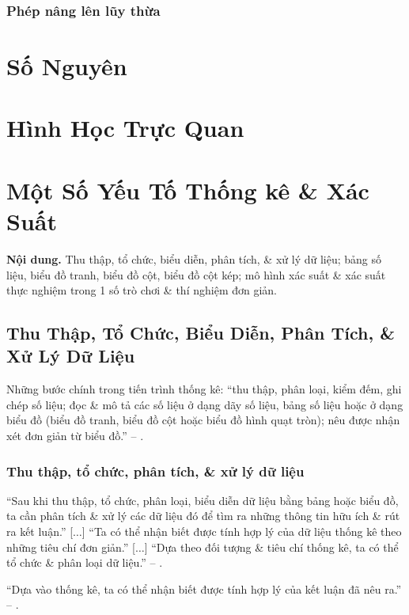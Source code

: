 \documentclass{article}
\numberwithin{equation}{section}
\begin{document}
\subsubsection{Phép nâng lên lũy thừa}

\section{Số Nguyên}

\section{Hình Học Trực Quan}

\section{Một Số Yếu Tố Thống kê \& Xác Suất}
\textbf{Nội dung.} Thu thập, tổ chức, biểu diễn, phân tích, \& xử lý dữ liệu; bảng số liệu, biểu đồ tranh, biểu đồ cột, biểu đồ cột kép; mô hình xác suất \& xác suất thực nghiệm trong 1 số trò chơi \& thí nghiệm đơn giản.

\subsection{Thu Thập, Tổ Chức, Biểu Diễn, Phân Tích, \& Xử Lý Dữ Liệu}
Những bước chính trong tiến trình thống kê: ``thu thập, phân loại, kiểm đếm, ghi chép số liệu; đọc \& mô tả các số liệu ở dạng dãy số liệu, bảng số liệu hoặc ở dạng biểu đồ (biểu đồ tranh, biểu đồ cột hoặc biểu đồ hình quạt tròn); nêu được nhận xét đơn giản từ biểu đồ.'' -- \cite[p. 3]{Thai_Anh_Dat_Ha_Loan_Nam_Quang_Toan_6_tap_2}.

\subsubsection{Thu thập, tổ chức, phân tích, \& xử lý dữ liệu}
``Sau khi thu thập, tổ chức, phân loại, biểu diễn dữ liệu bằng bảng hoặc biểu đồ, ta cần phân tích \& xử lý các dữ liệu đó để tìm ra những thông tin hữu ích \& rút ra kết luận.'' [$\ldots$] ``Ta có thể nhận biết được tính hợp lý của dữ liệu thống kê theo những tiêu chí đơn giản.'' [$\ldots$] ``Dựa theo đối tượng \& tiêu chí thống kê, ta có thể tổ chức \& phân loại dữ liệu.'' -- \cite[p. 4]{Thai_Anh_Dat_Ha_Loan_Nam_Quang_Toan_6_tap_2}.

``Dựa vào thống kê, ta có thể nhận biết được tính hợp lý của kết luận đã nêu ra.'' -- \cite[p. 5]{Thai_Anh_Dat_Ha_Loan_Nam_Quang_Toan_6_tap_2}.
\end{document}
